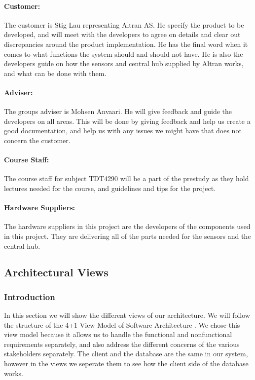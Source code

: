 \documentclass[../document.tex]{subfiles}
\begin{document}
\paragraph{Customer:} The customer is Stig Lau representing \gls{Altran} AS. He specify the product to be developed, and will meet with the developers to agree on details and clear out discrepancies around the product implementation. He has the final word when it comes to what functions the system should and should not have. He is also the developers guide on how the sensors and central hub supplied by \gls{Altran} works, and what can be done with them.

\paragraph{Adviser:} The groups adviser is Mohsen Anvaari. He will give feedback and guide the developers on all areas. This will be done by giving feedback and help us create a good documentation, and help us with any issues we might have that does not concern the customer.

\paragraph{Course Staff:} The course staff for subject TDT4290 will be a part of the prestudy as they hold lectures needed for the course, and guidelines and tips for the project. 

\paragraph{Hardware Suppliers:} The hardware suppliers in this project are the developers of the components used in this project. They are delivering all of the parts needed for the sensors and the central hub.

\subsection{Architectural Views}
\subsubsection{Introduction}
In this section we will show the different views of our architecture. We will follow the structure of the 4+1 View Model of Software Architecture \cite{view_model}. We chose this view model because it allows us to handle the functional and nonfunctional requirements separately, and also address the different concerns of the various stakeholders separately. The client and the database are the same in our system, however in the views we seperate them to see how the client side of the database works.
\end{document}
